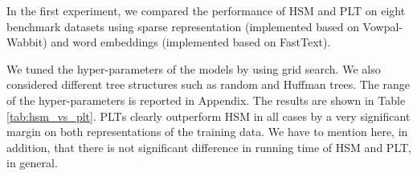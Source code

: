 \documentclass{article}
\newcommand{\Algo}[1]{\textsc{#1}}
\newcommand{\data}[3]{
    \begin{tabular}{ll}
    \rule{0pt}{0pt} #1 \\
    \rule{0pt}{0pt} #2 \\
    \rule{0pt}{0pt} #3 \\
    \end{tabular}
}
\newcommand{\databf}[3]{
    \textbf{
	\begin{tabular}{ll}
    \rule{0pt}{0pt} #1 \\
    \rule{0pt}{0pt} #2 \\
    \rule{0pt}{0pt} #3 \\
    \end{tabular}
	}
}
\begin{document}
{\begin{table*}[ht!]
\begin{center}
        \end{center}
	\vspace{-0.5cm}
\end{table*}
%
In the first experiment, we compared the performance of \Algo{HSM} and \Algo{PLT} on eight benchmark datasets using sparse representation (implemented based on Vowpal-Wabbit) and word embeddings (implemented based on FastText).
%

We tuned the hyper-parameters of the models by using grid search. We also considered different tree structures such as random and Huffman trees. The range of the hyper-parameters is reported in Appendix. The results are shown in Table \ref{tab:hsm_vs_plt}. \Algo{PLT}s clearly outperform \Algo{HSM} in all cases by a very significant margin on both representations of the training data. We have to mention here, in addition,  that there is not significant difference in running time of \Algo{HSM} and \Algo{PLT}, in general.

}
\end{document}
